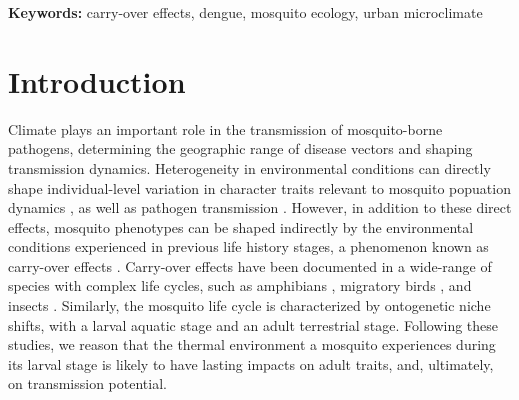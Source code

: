 \documentclass[12pt]{article}
\begin{document}
\smallskip

\textbf{Keywords:} carry-over effects, dengue, mosquito ecology, urban microclimate

\linenumbers
\doublespacing
\setlength\parindent{20pt}%

\newpage

\section{Introduction}

Climate plays an important role in the transmission of mosquito-borne pathogens, determining the geographic range of disease vectors and shaping transmission dynamics. Heterogeneity in environmental conditions can directly shape individual-level variation in character traits relevant to mosquito popuation dynamics \citep{delatte2009}, as well as pathogen transmission \citep{murdock2012}. However, in addition to these direct effects, mosquito phenotypes can be shaped indirectly by the environmental conditions experienced in previous life history stages, a phenomenon known as carry-over effects \citep{harrison2011}. Carry-over effects have been documented in a wide-range of species with complex life cycles, such as amphibians \citep{vonesh2005}, migratory birds \citep{norris2006}, and insects \citep{deblock2005a}. Similarly, the mosquito life cycle is characterized by ontogenetic niche shifts, with a larval aquatic stage and an adult terrestrial stage. Following these studies, we reason that the thermal environment a mosquito experiences during its larval stage is likely to have lasting impacts on adult traits, and, ultimately, on transmission potential.

\end{document}

